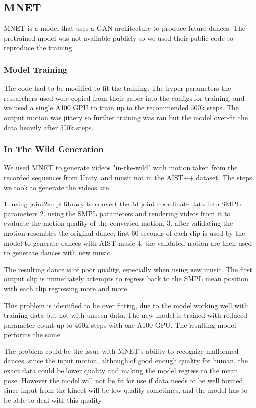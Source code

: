 \documentclass[final,5p,times,authoryear]{article}
\begin{document}
\subsection{MNET}

MNET is a model that uses a GAN architecture to produce future dances. The
pretrained model was not available publicly so we used their public code to
reproduce the training.

\subsubsection{Model Training}

The code had to be modified to fit the training. The hyper-parameters the
researchers used were copied from their paper into the configs for training, and
we used a single A100 GPU to train up to the recommended 500k steps. The output
motion was jittery so further training was ran but the model over-fit the data
heavily after 500k steps.

\subsubsection{In The Wild Generation}
We used MNET to generate videos "in-the-wild" with motion taken from the
recorded sequences from Unity, and music not in the AIST++ dataset. The steps we
took to generate the videos are.

1. using joint2smpl library to convert the 3d joint coordinate data into SMPL
parameters
2. using the SMPL parameters and rendering videos from it to evaluate the motion
quality of the converted motion.
3. after validating the motion resembles the original dance, first 60 seconds of
each clip is used by the model to generate dances with AIST music
4. the validated motion are then used to generate dances with new music

The resulting dance is of poor quality, especially when using new music. The
first output clip is immediately attempts to regress back to the SMPL mean
position with each clip regressing more and more.

This problem is identified to be over fitting, due to the model working well with
training data but not with unseen data. The new model is trained with reduced
parameter count up to 460k steps with one A100 GPU. The resulting model performs
the same

The problem could be the issue with MNET's ability to recognize malformed
dances, since the input motion, although of good enough quality for human, the
exact data could be lower quality and making the model regress to the mean pose.
However the model will not be fit for use if data needs to be well formed, since
input from the kinect will be low quality sometimes, and the model has to be
able to deal with this quality.
\end{document}
